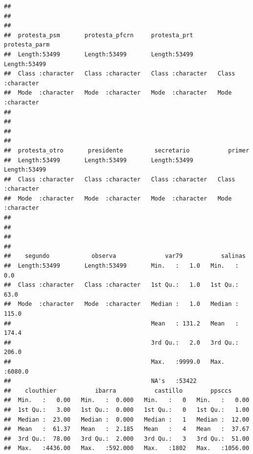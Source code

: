 \documentclass[
]{article}
\begin{document}
\begin{verbatim}
##                                                                             
##                                                                             
##                                                                             
##  protesta_psm       protesta_pfcrn     protesta_prt       protesta_parm     
##  Length:53499       Length:53499       Length:53499       Length:53499      
##  Class :character   Class :character   Class :character   Class :character  
##  Mode  :character   Mode  :character   Mode  :character   Mode  :character  
##                                                                             
##                                                                             
##                                                                             
##                                                                             
##  protesta_otro       presidente         secretario           primer         
##  Length:53499       Length:53499       Length:53499       Length:53499      
##  Class :character   Class :character   Class :character   Class :character  
##  Mode  :character   Mode  :character   Mode  :character   Mode  :character  
##                                                                             
##                                                                             
##                                                                             
##                                                                             
##    segundo            observa              var79           salinas      
##  Length:53499       Length:53499       Min.   :   1.0   Min.   :   0.0  
##  Class :character   Class :character   1st Qu.:   1.0   1st Qu.:  63.0  
##  Mode  :character   Mode  :character   Median :   1.0   Median : 115.0  
##                                        Mean   : 131.2   Mean   : 174.4  
##                                        3rd Qu.:   2.0   3rd Qu.: 206.0  
##                                        Max.   :9999.0   Max.   :6080.0  
##                                        NA's   :53422                    
##    clouthier           ibarra           castillo        ppsccs       
##  Min.   :   0.00   Min.   :  0.000   Min.   :   0   Min.   :   0.00  
##  1st Qu.:   3.00   1st Qu.:  0.000   1st Qu.:   0   1st Qu.:   1.00  
##  Median :  23.00   Median :  0.000   Median :   1   Median :  12.00  
##  Mean   :  61.37   Mean   :  2.185   Mean   :   4   Mean   :  37.67  
##  3rd Qu.:  78.00   3rd Qu.:  2.000   3rd Qu.:   3   3rd Qu.:  51.00  
##  Max.   :4436.00   Max.   :592.000   Max.   :1802   Max.   :1056.00  

\end{verbatim}
\end{document}
